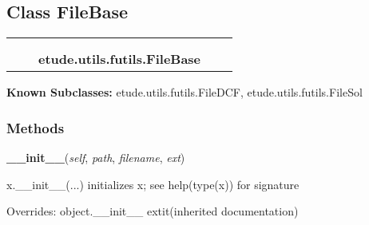 
\subsection{Class FileBase}

    \label{etude:utils:futils:FileBase}
\begin{tabular}{cccccc}
\multicolumn{2}{r}{\settowidth{\BCL}{object}\multirow{2}{\BCL}{object}}
&&
  \\\cline{3-3}
  &&\multicolumn{1}{c|}{}
&&
  \\
&&\multicolumn{2}{l}{\textbf{etude.utils.futils.FileBase}}
\end{tabular}

\textbf{Known Subclasses:}
etude.utils.futils.FileDCF,
    etude.utils.futils.FileSol



  \subsubsection{Methods}

    \vspace{0.5ex}

\hspace{.8\funcindent}\begin{boxedminipage}{\funcwidth}

    \raggedright \textbf{\_\_init\_\_}(\textit{self}, \textit{path}, \textit{filename}, \textit{ext})

\setlength{\parskip}{2ex}
    x.\_\_init\_\_(...) initializes x; see help(type(x)) for signature

\setlength{\parskip}{1ex}
      Overrides: object.\_\_init\_\_ 	extit{(inherited documentation)}

    \end{boxedminipage}

    \label{etude:utils:futils:FileBase:load}

